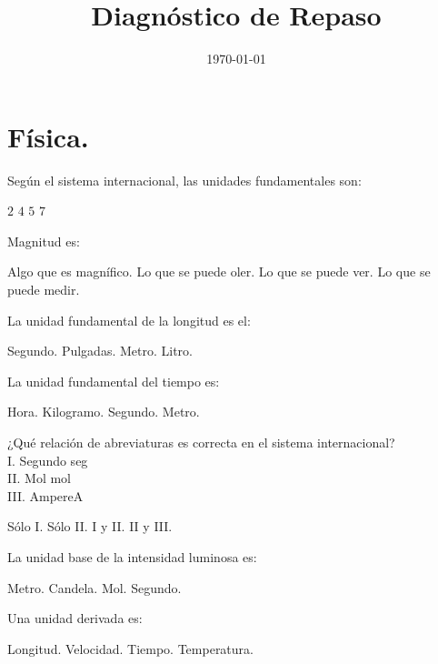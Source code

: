 \documentclass[12pt]{exam}
\title{\vspace*{-2cm}Diagnóstico de Repaso\vspace{-5ex}}
\date{\today}
\begin{document}
\maketitle

\section{Física.}

\begin{questions}
    \question Según el sistema internacional, las unidades fundamentales son:
    \\[0.5em]
    \begin{oneparchoices}
        \choice $2$
        \choice $4$
        \choice $5$
        \choice $7$
    \end{oneparchoices}
    \question Magnitud es:
    \begin{choices}
        \choice Algo que es magnífico.
        \choice Lo que se puede oler.
        \choice Lo que se puede ver.
        \choice Lo que se puede medir.
    \end{choices}
    \question La unidad fundamental de la longitud es el:
    \\[0.5em]
    \begin{oneparchoices}
        \choice Segundo.
        \choice Pulgadas.
        \choice Metro.
        \choice Litro.
    \end{oneparchoices}
    \question La unidad fundamental del tiempo es:
    \\[0.5em]
    \begin{oneparchoices}
        \choice Hora.
        \choice Kilogramo.
        \choice Segundo.        
        \choice Metro.
    \end{oneparchoices}
    \question ¿Qué relación de abreviaturas es correcta en el sistema internacional?
    \\[0.5em]
    I. \quad Segundo \quad seg \\
    II. \quad Mol \quad mol \\
    III. \quad Ampere\quad A 
    \\[0.5em]
    \begin{oneparchoices}
        \choice Sólo I.
        \choice Sólo II.
        \choice I y II.
        \choice II y III.    
    \end{oneparchoices}
    \question La unidad base de la intensidad luminosa es:
    \\[0.5em]
    \begin{oneparchoices}
        \choice Metro.
        \choice Candela.
        \choice Mol.
        \choice Segundo.
    \end{oneparchoices}
    \question Una unidad derivada es:
    \\[0.5em]
    \begin{oneparchoices}
        \choice Longitud.
        \choice Velocidad.
        \choice Tiempo.
        \choice Temperatura.
    \end{oneparchoices}
\end{questions}
\end{document}
